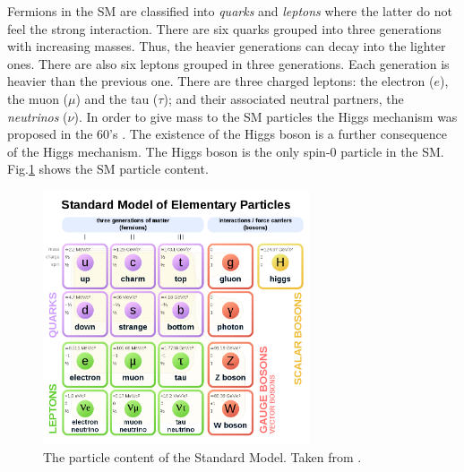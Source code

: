 Fermions in the SM are classified into \textit{quarks} and \textit{leptons} where the latter do not feel the strong interaction. There are six quarks grouped into three generations with increasing masses. Thus, the heavier generations can decay into the lighter ones. There are also six leptons grouped in three generations. Each generation is heavier than the previous one. There are three charged leptons: the electron ($e$), the muon ($\mu$) and the tau ($\tau$); and their associated neutral partners, the \textit{neutrinos} ($\nu$). In order to give mass to the SM particles the Higgs mechanism was proposed in the 60's \cite{PhysRevLett.13.508,PhysRevLett.13.321,PhysRevLett.13.585}. The existence of the Higgs boson is a further consequence of the Higgs mechanism. The Higgs boson is the only spin-0 particle in the SM. Fig.\ref{Fig14} shows the SM particle content.
\begin{figure}[h]
	\centering
	\includegraphics[width=0.7\textwidth]{figures/Fig14}
	\caption{The particle content of the Standard Model. Taken from \cite{SMImage}.}
	\label{Fig14}
\end{figure}
